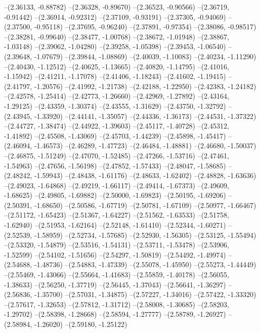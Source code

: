 --(2.36133, -0.88782)
--(2.36328, -0.89670)
--(2.36523, -0.90566)
--(2.36719, -0.91442)
--(2.36914, -0.92312)
--(2.37109, -0.93191)
--(2.37305, -0.94069)
--(2.37500, -0.95118)
--(2.37695, -0.96240)
--(2.37891, -0.97354)
--(2.38086, -0.98517)
--(2.38281, -0.99640)
--(2.38477, -1.00768)
--(2.38672, -1.01948)
--(2.38867, -1.03148)
--(2.39062, -1.04280)
--(2.39258, -1.05398)
--(2.39453, -1.06540)
--(2.39648, -1.07679)
--(2.39844, -1.08869)
--(2.40039, -1.10083)
--(2.40234, -1.11290)
--(2.40430, -1.12512)
--(2.40625, -1.13665)
--(2.40820, -1.14795)
--(2.41016, -1.15942)
--(2.41211, -1.17078)
--(2.41406, -1.18243)
--(2.41602, -1.19415)
--(2.41797, -1.20576)
--(2.41992, -1.21738)
--(2.42188, -1.22950)
--(2.42383, -1.24182)
--(2.42578, -1.25414)
--(2.42773, -1.26660)
--(2.42969, -1.27892)
--(2.43164, -1.29125)
--(2.43359, -1.30374)
--(2.43555, -1.31629)
--(2.43750, -1.32792)
--(2.43945, -1.33920)
--(2.44141, -1.35057)
--(2.44336, -1.36173)
--(2.44531, -1.37322)
--(2.44727, -1.38474)
--(2.44922, -1.39603)
--(2.45117, -1.40728)
--(2.45312, -1.41892)
--(2.45508, -1.43069)
--(2.45703, -1.44239)
--(2.45898, -1.45417)
--(2.46094, -1.46573)
--(2.46289, -1.47723)
--(2.46484, -1.48881)
--(2.46680, -1.50037)
--(2.46875, -1.51249)
--(2.47070, -1.52485)
--(2.47266, -1.53716)
--(2.47461, -1.54963)
--(2.47656, -1.56198)
--(2.47852, -1.57433)
--(2.48047, -1.58685)
--(2.48242, -1.59943)
--(2.48438, -1.61176)
--(2.48633, -1.62402)
--(2.48828, -1.63636)
--(2.49023, -1.64868)
--(2.49219, -1.66117)
--(2.49414, -1.67373)
--(2.49609, -1.68625)
--(2.49805, -1.69882)
--(2.50000, -1.69823)
--(2.50195, -1.69206)
--(2.50391, -1.68650)
--(2.50586, -1.67719)
--(2.50781, -1.67109)
--(2.50977, -1.66467)
--(2.51172, -1.65423)
--(2.51367, -1.64227)
--(2.51562, -1.63533)
--(2.51758, -1.62940)
--(2.51953, -1.62164)
--(2.52148, -1.61410)
--(2.52344, -1.60271)
--(2.52539, -1.58959)
--(2.52734, -1.57685)
--(2.52930, -1.56305)
--(2.53125, -1.55494)
--(2.53320, -1.54879)
--(2.53516, -1.54131)
--(2.53711, -1.53478)
--(2.53906, -1.52599)
--(2.54102, -1.51656)
--(2.54297, -1.50819)
--(2.54492, -1.49974)
--(2.54688, -1.48736)
--(2.54883, -1.47339)
--(2.55078, -1.45950)
--(2.55273, -1.44449)
--(2.55469, -1.43066)
--(2.55664, -1.41683)
--(2.55859, -1.40178)
--(2.56055, -1.38633)
--(2.56250, -1.37719)
--(2.56445, -1.37043)
--(2.56641, -1.36297)
--(2.56836, -1.35700)
--(2.57031, -1.34875)
--(2.57227, -1.34016)
--(2.57422, -1.33320)
--(2.57617, -1.32653)
--(2.57812, -1.31712)
--(2.58008, -1.30685)
--(2.58203, -1.29702)
--(2.58398, -1.28668)
--(2.58594, -1.27777)
--(2.58789, -1.26927)
--(2.58984, -1.26020)
--(2.59180, -1.25122)
